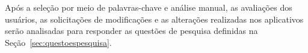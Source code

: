Após a seleção por meio de palavras-chave e análise manual, 
as avaliações dos usuários, as solicitações de modificações e as alterações realizadas nos aplicativos serão analisadas para responder as questões de pesquisa definidas na Seção~\ref{sec:questoespesquisa}.


	
	
	
	


